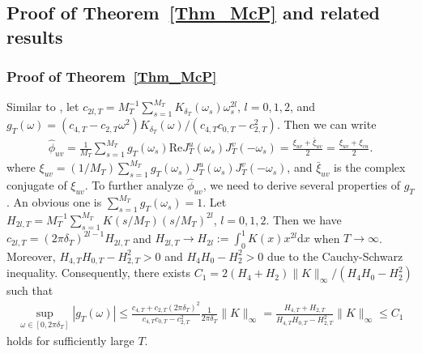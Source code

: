 \documentclass[11pt]{article}
\numberwithin{equation}{section}
\theoremstyle{plain}
\theoremstyle{definition}
\theoremstyle{definition}
\theoremstyle{assumption}
\theoremstyle{proposition}
\theoremstyle{proposition}
\theoremstyle{example}
\theoremstyle{lemma}
\theoremstyle{theorem}
\theoremstyle{remark}
\begin{document}
\subsection{Proof of Theorem~\ref{Thm_McP} and related results}
\subsubsection{Proof of Theorem~\ref{Thm_McP}}\label{proof_Thm_McP_sect}
Similar to \citet{McElroy_and_Politis2025}, let $c_{2l,T} = M_T^{-1}\sum_{s=1}^{M_T} K_{\delta_T}(\omega_s)\omega_s^{2l}$, $l=0,1,2$, and $g_T(\omega) = (c_{4,T} - c_{2,T}\omega^2)K_{\delta_T}(\omega)/(c_{4,T}c_{0,T} - c_{2,T}^2)$. Then we can write 
\begin{align*}
\hat{\phi}_{uv} = \frac{1}{M_T}\sum_{s=1}^{M_T}g_T(\omega_s)\mathrm{Re}J_{T}^{u}(\omega_s)J_{T}^{v}(-\omega_s)
=\frac{\xi_{uv} + \bar{\xi}_{uv}}{2}
=\frac{\xi_{uv} + \xi_{vu}}{2}.
\end{align*}
where $\xi_{uv}=(1/M_T)\sum_{s=1}^{M_T}g_T(\omega_s)J_{T}^{u}(\omega_s)J_{T}^{v}(-\omega_s)$, and $\bar{\xi}_{uv}$ is the complex conjugate of $\xi_{uv}$. To further analyze $\hat{\phi}_{uv}$, we need to derive several properties of $g_T$. An obvious one is $\sum_{s=1}^{M_T}g_T(\omega_s)=1$. Let $H_{2l,T} = M_T^{-1}\sum_{s=1}^{M_T} K(s/M_T)(s/M_T)^{2l}$, $l=0,1,2$. Then we have $c_{2l,T} = (2\pi\delta_T)^{2l-1}H_{2l,T}$ and $H_{2l,T}\rightarrow H_{2l}:=\int_0^1 K(x)x^{2l}\mathrm{d}x$ when $T\rightarrow\infty$. Moreover, $H_{4,T}H_{0,T} - H_{2,T}^2>0$ and $H_{4}H_{0} - H_{2}^2>0$ due to the Cauchy-Schwarz inequality. Consequently, there exists $C_1=2(H_4 + H_2)\|K\|_{\infty}/(H_4H_0 - H_2^2)$ such that
\begin{align}\label{eq_bound_gT}
\sup_{\omega\in[0,2\pi\delta_T]}|g_T(\omega)|
\leqslant \frac{c_{4,T} + c_{2,T}(2\pi\delta_T)^2}{c_{4,T}c_{0,T} - c_{2,T}^2}\frac{1}{2\pi\delta_T}\|K\|_{\infty}
= \frac{H_{4,T} + H_{2,T}}{H_{4,T}H_{0,T} - H_{2,T}^2}\|K\|_{\infty}
\leqslant C_1
\end{align}
holds for sufficiently large $T$.
\end{document}
